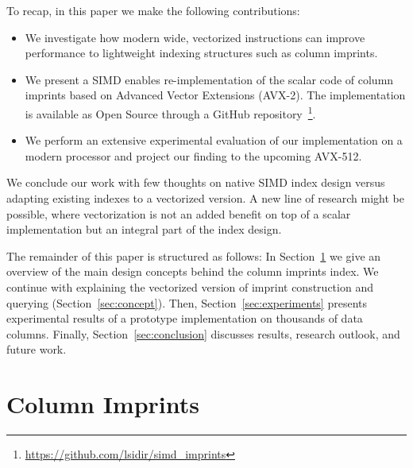 \documentclass[sigconf]{acmart}
\begin{document}
To recap, in this paper we make the following contributions:
\begin{itemize}
    \item We investigate how modern wide, vectorized instructions can improve performance to lightweight indexing structures such as column imprints.
    \item We present a SIMD enables re-implementation of the scalar code of column imprints based on Advanced Vector Extensions (AVX-2). The implementation is available as Open Source through a GitHub repository~\footnote{\url{https://github.com/lsidir/simd_imprints}}.
    \item We perform an extensive experimental evaluation of our implementation on a modern processor and project our finding to the upcoming AVX-512.
\end{itemize}

We conclude our work with few thoughts on native SIMD index design versus 
adapting existing indexes to a vectorized version. A new line of research might be 
possible, where vectorization is not an added benefit on top of a scalar implementation but an integral part of the index design. 

The remainder of this paper is structured as follows: In Section~\ref{sec:imprints} we give an overview of the main design concepts behind the column imprints index. We continue with explaining the vectorized version of imprint construction and querying (Section~\ref{sec:concept}). Then, Section~\ref{sec:experiments} presents experimental results of a prototype implementation on thousands of data columns. Finally, Section~\ref{sec:conclusion} discusses results, research outlook, and future work.

\section{Column Imprints}\label{sec:imprints}
\end{document}
